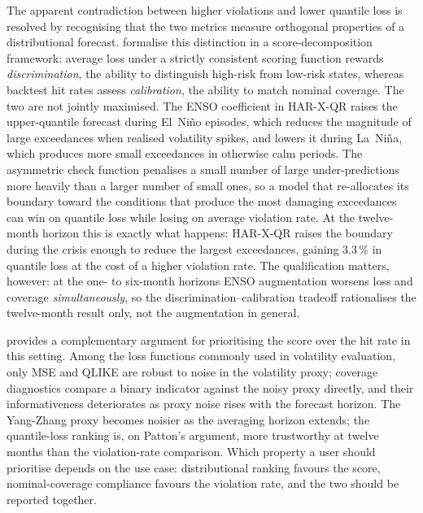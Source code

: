 The apparent contradiction between higher violations and lower quantile loss
is resolved by recognising that the two metrics measure orthogonal
properties of a distributional forecast. \textcite{dimitriadisStatisticalInferenceScore2026}
formalise this distinction in a score-decomposition framework: average loss
under a strictly consistent scoring function rewards
\emph{discrimination}, the ability to distinguish high-risk from low-risk
states, whereas backtest hit rates assess \emph{calibration}, the ability
to match nominal coverage. The two are not jointly maximised. The ENSO
coefficient in HAR-X-QR raises the upper-quantile forecast during El~Ni\~no
episodes, which reduces the magnitude of large exceedances when realised
volatility spikes, and lowers it during La~Ni\~na, which produces more
small exceedances in otherwise calm periods. The asymmetric check function
penalises a small number of large under-predictions more heavily than a
larger number of small ones, so a model that re-allocates its boundary
toward the conditions that produce the most damaging exceedances can win on
quantile loss while losing on average violation rate. At the twelve-month
horizon this is exactly what happens: HAR-X-QR raises the boundary during
the crisis enough to reduce the largest exceedances, gaining $3.3\,\%$ in
quantile loss at the cost of a higher violation rate. The qualification
matters, however: at the one- to six-month horizons ENSO augmentation
worsens loss and coverage \emph{simultaneously}, so the
discrimination--calibration tradeoff rationalises the twelve-month result
only, not the augmentation in general.

\textcite{pattonVolatilityForecastComparison} provides a complementary
argument for prioritising the score over the hit rate in this setting.
Among the loss functions commonly used in volatility evaluation, only MSE
and QLIKE are robust to noise in the volatility proxy; coverage diagnostics
compare a binary indicator against the noisy proxy directly, and their
informativeness deteriorates as proxy noise rises with the forecast
horizon. The Yang-Zhang proxy becomes noisier as the averaging horizon
extends; the quantile-loss ranking is, on Patton's argument, more
trustworthy at twelve months than the violation-rate comparison. Which
property a user should prioritise depends on the use case: distributional
ranking favours the score, nominal-coverage compliance favours the
violation rate, and the two should be reported together.

